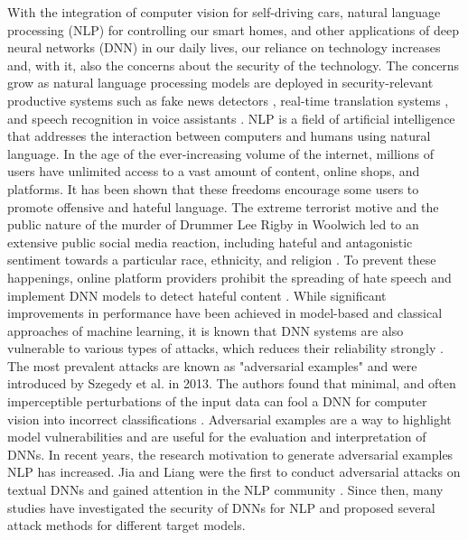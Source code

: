 With the integration of computer vision for self-driving cars, natural language processing (NLP) for controlling our smart homes, and other applications of deep neural networks (DNN) in our daily lives, our reliance on technology increases and, with it, also the concerns about the security of the technology. The concerns grow as natural language processing models are deployed in security-relevant productive systems such as fake news detectors \cite{singhania20173han}, real-time translation systems \cite{zhang2015deep}, and speech recognition in voice assistants \cite{deng2013new}.
NLP is a field of artificial intelligence that addresses the interaction between computers and humans using natural language.  
In the age of the ever-increasing volume of the internet, millions of users have unlimited access to a vast amount of content, online shops, and platforms. It has been shown that these freedoms encourage some users to promote offensive and hateful language. The extreme terrorist motive and the public nature of the murder of Drummer Lee Rigby in Woolwich led to an extensive public social media reaction, including hateful and antagonistic sentiment towards a particular race, ethnicity, and religion \cite{burnap2014hate}.
To prevent these happenings, online platform providers prohibit the spreading of hate speech and implement DNN models to detect hateful content \cite{badjatiya2017deep}.
While significant improvements in performance have been achieved in model-based and classical approaches of machine learning, it is known that DNN systems are also vulnerable to various types of attacks, which reduces their reliability strongly \cite{papernot2018sok}. The most prevalent attacks are known as "adversarial examples" and were introduced by Szegedy et al. in 2013. The authors found that minimal, and often imperceptible perturbations of the input data can fool a DNN for computer vision into incorrect classifications \cite{szegedy2013intriguing}.
Adversarial examples are a way to highlight model vulnerabilities and are useful for the evaluation and interpretation of DNNs. 
In recent years, the research motivation to generate adversarial examples NLP has increased. Jia and Liang were the first to conduct adversarial attacks on textual DNNs and gained attention in the NLP community \cite{Jia2017AdversarialEF}. Since then, many studies have investigated the security of DNNs for NLP and proposed several attack methods for different target models. 

